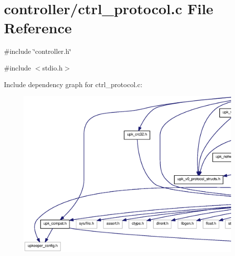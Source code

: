 \section{controller/ctrl\_\-protocol.c File Reference}
\label{ctrl__protocol_8c}
{\ttfamily \#include \char`\"{}controller.h\char`\"{}}\par
{\ttfamily \#include $<$stdio.h$>$}\par
Include dependency graph for ctrl\_\-protocol.c:
\nopagebreak
\begin{figure}[H]
\begin{center}
\leavevmode
\includegraphics[width=400pt]{ctrl__protocol_8c__incl}
\end{center}
\end{figure}
